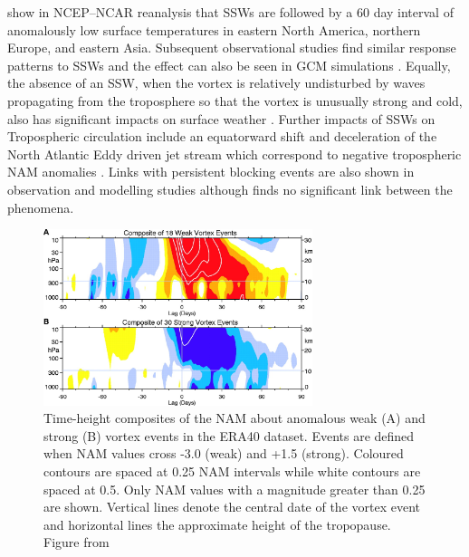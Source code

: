 \cite{thompsonStratospheric2002b} show in NCEP–NCAR reanalysis that SSWs are followed by a 60 day interval of anomalously low surface temperatures in eastern North America, northern Europe, and eastern Asia. Subsequent observational studies find similar response patterns to SSWs \citep{kolstadAssociation2010b, kingObserved2019b, lehtonenObserved2016b} and the effect can also be seen in GCM simulations \citep{tomassiniRole2012b, lehtonenObserved2016b}. Equally, the absence of an SSW, when the vortex is relatively undisturbed by waves propagating from the troposphere so that the vortex is unusually strong and cold, also has significant impacts on surface weather \citep{shawLife2013b, lawrenceRemarkably2020b}. Further impacts of SSWs on Tropospheric circulation include an equatorward shift and deceleration of the North Atlantic Eddy driven jet stream which correspond to negative tropospheric NAM anomalies \citep{hitchcockDownward2014b,maycockRegime2020b}. Links with persistent blocking events are also shown in observation and modelling studies \citep{daviniBlocking2014b, vialSudden2013b} although \cite{taguchiThere2008b} finds no significant link between the phenomena.

\begin{figure}[h!]
\centering
    \includegraphics[width=0.7\textwidth]{Figures/Figures-background/baldwin_composite.jpg}
    \caption[Time-height composites of the NAM about anomalous vortex events in the ERA40 dataset from \cite{baldwinStratospheric2001a}.]{Time-height composites of the NAM about anomalous weak (A) and strong (B) vortex events in the ERA40 dataset. Events are defined when NAM values cross -3.0 (weak) and +1.5 (strong). Coloured contours are spaced at 0.25 NAM intervals while white contours are spaced at 0.5. Only NAM values with a magnitude greater than 0.25 are shown. Vertical lines denote the central date of the vortex event and horizontal lines the approximate height of the tropopause. Figure from \cite{baldwinStratospheric2001a}}  
    \label{fig:Baldwin_composite}
\centering
\end{figure}

